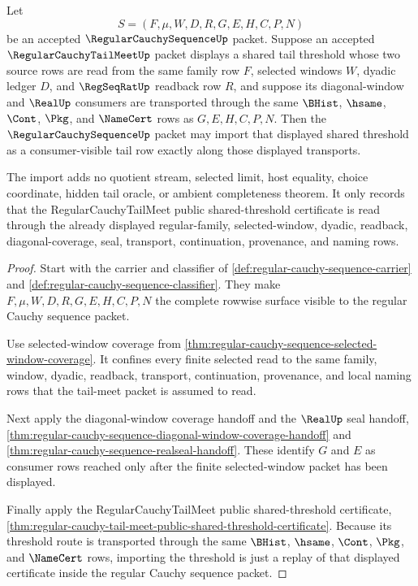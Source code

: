 \begin{theorem}
\label{thm:regular-cauchy-sequence-shared-threshold-import}
Let
$$
S=(F,\mu,W,D,R,G,E,H,C,P,N)
$$
be an accepted $\RegularCauchySequenceUp$ packet. Suppose an accepted $\RegularCauchyTailMeetUp$ packet displays a shared tail threshold whose two source rows are read from the same family row $F$, selected windows $W$, dyadic ledger $D$, and $\RegSeqRatUp$ readback row $R$, and suppose its diagonal-window and $\RealUp$ consumers are transported through the same $\BHist$, $\hsame$, $\Cont$, $\Pkg$, and $\NameCert$ rows as $G,E,H,C,P,N$. Then the $\RegularCauchySequenceUp$ packet may import that displayed shared threshold as a consumer-visible tail row exactly along those displayed transports.

The import adds no quotient stream, selected limit, host equality, choice coordinate, hidden tail oracle, or ambient completeness theorem. It only records that the RegularCauchyTailMeet public shared-threshold certificate is read through the already displayed regular-family, selected-window, dyadic, readback, diagonal-coverage, seal, transport, continuation, provenance, and naming rows.
\end{theorem}
\begin{proof}
Start with the carrier and classifier of \autoref{def:regular-cauchy-sequence-carrier} and \autoref{def:regular-cauchy-sequence-classifier}. They make $F,\mu,W,D,R,G,E,H,C,P,N$ the complete rowwise surface visible to the regular Cauchy sequence packet.

Use selected-window coverage from \autoref{thm:regular-cauchy-sequence-selected-window-coverage}. It confines every finite selected read to the same family, window, dyadic, readback, transport, continuation, provenance, and local naming rows that the tail-meet packet is assumed to read.

Next apply the diagonal-window coverage handoff and the $\RealUp$ seal handoff, \autoref{thm:regular-cauchy-sequence-diagonal-window-coverage-handoff} and \autoref{thm:regular-cauchy-sequence-realseal-handoff}. These identify $G$ and $E$ as consumer rows reached only after the finite selected-window packet has been displayed.

Finally apply the RegularCauchyTailMeet public shared-threshold certificate, \autoref{thm:regular-cauchy-tail-meet-public-shared-threshold-certificate}. Because its threshold route is transported through the same $\BHist$, $\hsame$, $\Cont$, $\Pkg$, and $\NameCert$ rows, importing the threshold is just a replay of that displayed certificate inside the regular Cauchy sequence packet.
\end{proof}

